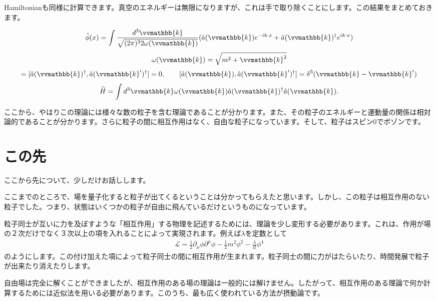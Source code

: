 \documentclass[report,paper=a4, fontsize=12pt, line_length=16cm, number_of_lines=33,dvipdfmx]{jlreq}
\newenvironment{important}{\begin{tcolorbox}[
  colback = white,
  colframe = red!35,
  boxrule = 2mm,
  fonttitle = \bfseries,
  after = \noindent] }{\end{tcolorbox}}
\numberwithin{equation}{chapter}
\newcommand{\del}{\partial}
\newcommand{\kb}{\vvmathbb{k}}
\newcommand{\Lcal}{\mathcal{L}}
\newcommand{\phih}{\hat{\phi}}
\newcommand{\Hh}{\widehat{H}}
\newcommand{\ah}{\hat{a}}
\begin{document}
Hamiltonianも同様に計算できます。真空のエネルギーは無限になりますが、これは手で取り除くことにします。この結果をまとめておきます。
\begin{important}
  \begin{align}
    \phih(x)=\int\frac{d^3\kb}{\sqrt{(2\pi)^32\omega(\kb)}}
    (\ah(\kb)e^{-ik\cdot x} +\ah(\kb)^{\dag}e^{ik\cdot x})
  \end{align}
  \begin{align}
    \omega(\kb)=\sqrt{m^2+\kb^2}
  \end{align}
  \begin{align}
    [\ah(\kb),\ah(\kb')]=[\ah(\kb)^{\dag},\ah(\kb')^{\dag}]=0,\qquad
    [\ah(\kb),\ah(\kb')^{\dag}]=\delta^3(\kb-\kb')
  \end{align}
  \begin{align}
    \Hh=\int d^3\kb\omega(\kb)\ah(\kb)^{\dag}\ah(\kb).
  \end{align}
\end{important}
ここから、やはりこの理論には様々な数の粒子を含む理論であることが分かります。また、その粒子のエネルギーと運動量の関係は相対論的であることが分かります。さらに粒子の間に相互作用はなく、自由な粒子になっています。そして、粒子はスピン0でボゾンです。

\section{この先}

ここから先について、少しだけお話しします。

ここまでのところで、場を量子化すると粒子が出てくるということは分かってもらえたと思います。しかし、この粒子は相互作用のない粒子でした。つまり、状態はいくつかの粒子が自由に飛んているだけというものになっています。

粒子同士が互いに力を及ぼすような「相互作用」する物理を記述するためには、理論を少し変形する必要があります。これは、作用が場の２次だけでなく３次以上の項を入れることによって実現されます。例えば$\lambda$を定数として
\begin{align}
  \Lcal=\frac12 \del_{\mu}\phi\del^{\mu}\phi-\frac12 m^2\phi^2-\frac{\lambda}{4!}\phi^4
\end{align}
のようにします。この付け加えた項によって粒子同士の間に相互作用が生まれます。粒子同士の間に力がはたらいたり、時間発展で粒子が出来たり消えたりします。

自由場は完全に解くことができましたが、相互作用のある場の理論は一般的には解けません。したがって、相互作用のある理論で何か計算するためには近似法を用いる必要があります。このうち、最も広く使われている方法が摂動論です。
\end{document}
